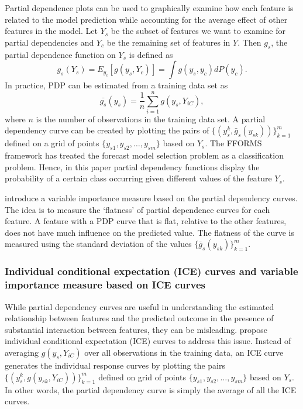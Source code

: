 \documentclass[11pt,a4paper,]{article}
\begin{document}
Partial dependence plots can be used to graphically examine how each feature is related to the model prediction while accounting for the average effect of other features in the model. Let \(Y_s\) be the subset of features we want to examine for partial dependencies and \(Y_c\) be the remaining set of features in \(Y\). Then \(g_s\), the partial dependence function on \(Y_s\) is defined as
\[g_s(Y_s)=E_{y_c}[g(y_s, Y_c)]=\int{g(y_s, y_c)dP(y_c).}\]
In practice, PDP can be estimated from a training data set as
\[\bar{g_s}(y_s)=\frac{1}{n}\sum_{i=1}^{n}g(y_s, Y_{iC}),\]
where \(n\) is the number of observations in the training data set. A partial dependency curve can be created by plotting the pairs of \(\{(y_s^k, \bar{g}_s(y_{sk}))\}_{k=1}^{m}\) defined on a grid of points \(\{y_{s1}, y_{s2},\dots, y_{sm}\}\) based on \(Y_s\). The FFORMS framework has treated the forecast model selection problem as a classification problem. Hence, in this paper partial dependency functions display the probability of a certain class occurring given different values of the feature \(Y_s\).

\textcite{Greenwell2018} introduce a variable importance measure based on the partial dependency curves. The idea is to measure the `flatness' of partial dependence curves for each feature. A feature with a PDP curve that is flat, relative to the other features, does not have much influence on the predicted value. The flatness of the curve is measured using the standard deviation of the values \(\{\bar{g}_{s}(y_{sk})\}_{k=1}^{m}\).

\hypertarget{individual-conditional-expectation-ice-curves-and-variable-importance-measure-based-on-ice-curves}{%
\subsubsection{Individual conditional expectation (ICE) curves and variable importance measure based on ICE curves}\label{individual-conditional-expectation-ice-curves-and-variable-importance-measure-based-on-ice-curves}}

While partial dependency curves are useful in understanding the estimated relationship between features and the predicted outcome in the presence of substantial interaction between features, they can be misleading. \textcite{goldstein2015peeking} propose individual conditional expectation (ICE) curves to address this issue. Instead of
averaging \(g(y_s, Y_{iC})\) over all observations in the training data, an ICE curve generates the individual response curves by plotting the pairs \(\{(y_s^k, g(y_{sk}, Y_{iC}))\}_{k=1}^{m}\) defined on grid of points \(\{y_{s1}, y_{s2},\dots, y_{sm}\}\) based on \(Y_s\). In other words, the partial dependency curve is simply the average of all the ICE curves.
\end{document}
